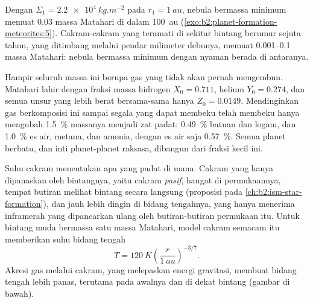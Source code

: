 Dengan $\Sigma_1 = \qty{2.2e4}{kg.m^{-2}}$ pada $r_1 = \qty{1}{au}$, nebula bermassa minimum
memuat $0.03$ massa Matahari di dalam \qty{100}{au} (\cref{exo:b2:planet-formation-meteorites:5}). Cakram-cakram
yang teramati di sekitar bintang berumur sejuta tahun, yang ditimbang melalui pendar milimeter
debunya, memuat \numrange{0.001}{0.1} massa Matahari: nebula bermassa minimum
dengan nyaman berada di antaranya.

Hampir seluruh massa ini berupa gas yang tidak akan pernah mengembun. Matahari lahir
dengan fraksi massa hidrogen $X_0 = 0.711$, helium $Y_0 = 0.274$, dan
semua unsur yang lebih berat bersama-sama hanya $Z_0 = 0.0149$. Mendinginkan gas berkomposisi
ini sampai segala yang dapat membeku telah membeku hanya mengubah
\qty{1.5}{\percent} massanya menjadi zat padat: \qty{0.49}{\percent} batuan dan
logam, dan \qty{1.0}{\percent} es air, metana, dan amonia, dengan es air
saja \qty{0.57}{\percent}. Semua planet berbatu, dan inti planet-planet
raksasa, dibangun dari fraksi kecil ini.

Suhu cakram menentukan apa yang padat di mana. Cakram yang hanya dipanaskan oleh
bintangnya, yaitu cakram \emph{pasif}, hangat di permukaannya, tempat butiran melihat
bintang secara langsung (proposisi pada \cref{ch:b2:ism-star-formation}), dan
jauh lebih dingin di bidang tengahnya, yang hanya menerima inframerah yang dipancarkan
ulang oleh butiran-butiran permukaan itu. Untuk bintang muda bermassa satu massa Matahari,
model cakram semacam itu memberikan suhu bidang tengah
\[
  T = \qty{120}{K}\left(\frac{r}{\qty{1}{au}}\right)^{-3/7}.
\]
Akresi gas melalui cakram, yang melepaskan energi gravitasi, membuat
bidang tengah lebih panas, terutama pada awalnya dan di dekat bintang (gambar di bawah).

